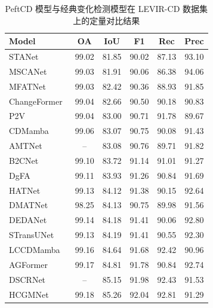 \begin{table}[!htbp]
\centering
\caption{PeftCD 模型与经典变化检测模型在 LEVIR-CD 数据集上的定量对比结果}
\label{tab:peftcd_levir}
\begin{tabular}{l c c c c c}
\toprule
\textbf{Model} & \textbf{OA} & \textbf{IoU} & \textbf{F1} & \textbf{Rec} & \textbf{Prec} \\
\midrule
    STANet~\cite{chen_spatial-temporal_2020}   & 99.02 & 81.85 & 90.02 & 87.13 & 93.10 \\
    MSCANet~\cite{m_liu_cnn-transformer_2022}          &  99.03 &  81.91 &  90.06 &  86.38 &  94.06  \\
    MFATNet~\cite{Mao2022MFATNetMF}          &  99.03 &  82.42 &  90.36 &  88.93 &  91.85  \\
    ChangeFormer~\cite{bandara2022transformer}     &  99.04 &  82.66 &  90.50 &  90.18 &  90.83  \\
    P2V~\cite{lin_transition_2023}              &  99.04 &  83.00 &  90.71 &  91.78 &  89.67  \\
    CDMamba~\cite{zhang_cdmamba_2025}          &  99.06 &  83.07 &  90.75 &  90.08 &  91.43  \\
    AMTNet~\cite{Liu2023AnAM}           &   --   &  83.08 &  90.76 &  89.71 &  91.82  \\
    B2CNet~\cite{Zhang2024B2CNetAP} & 99.10 & 83.72 & 91.14 & 91.01 & 91.27 \\
    DgFA~\cite{f_zhou_dual-granularity_2025}   & 99.11 & 83.93 & 91.26 & 90.84 & 91.69 \\
    HATNet~\cite{Xu2024HybridAT} & 99.13 & 84.12 & 91.38 & 90.15 & 92.64 \\
    DMATNet~\cite{Song2022RemoteSI}          &  98.25 &  84.13 &  90.75 &  89.98 &  91.56  \\
    DEDANet~\cite{Li2025DifferenceEA}          &  99.14 &  84.18 &  91.41 &  90.06 &  92.80  \\
    STransUNet~\cite{Yuan2022STransUNetAS}       &  99.13 &  84.19 &  91.41 &  90.55 &  92.30  \\
    LCCDMamba~\cite{Huang2025LCCDMambaVS}       &  99.16 &  84.64 &  91.68 &  92.42 &  90.96  \\
    AGFormer~\cite{Chen2025AGFormerAA}         &  99.17 &  84.81 &  91.78 &  90.84 &  92.74  \\
    DSCRNet~\cite{Zhang2025ADS}         &  -- &  85.15 &  91.98 &  92.43 &  91.53  \\
    HCGMNet~\cite{Han2023HCGMNetAH}          &  99.18 &  85.26 &  92.04 &  92.81 &  91.29  \\

\end{tabular}
\end{table}
